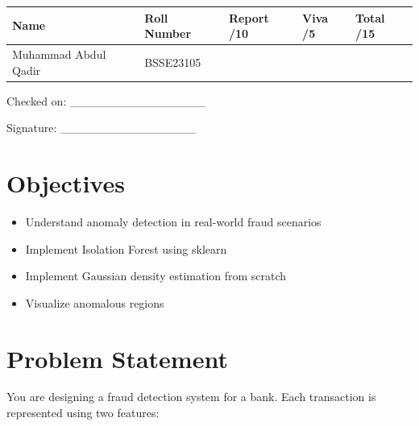 \documentclass[12pt,a4paper]{article}
\begin{document}
\renewcommand{\arraystretch}{2.0}
\begin{tabularx}{\textwidth}{|Y|Y|Y|Y|Y|}
\hline
\textbf{Name} & \textbf{Roll Number} & \textbf{Report /10} & \textbf{Viva /5} & \textbf{Total /15} \\
\hline
Muhammad Abdul Qadir & BSSE23105 & & & \\
\hline
\end{tabularx}
\renewcommand{\arraystretch}{1.0}

\vspace{12pt}

\begin{flushright}
Checked on: \_\_\_\_\_\_\_\_\_\_\_\_\_\_\_\_

\vspace{6pt}

Signature: \_\_\_\_\_\_\_\_\_\_\_\_\_\_\_\_
\end{flushright}

\newpage


\section*{Objectives}

\begin{itemize}
\item Understand anomaly detection in real-world fraud scenarios
\item Implement Isolation Forest using sklearn
\item Implement Gaussian density estimation from scratch
\item Visualize anomalous regions
\end{itemize}


\section*{Problem Statement}

You are designing a fraud detection system for a bank. Each transaction is represented using two features:
\end{document}
